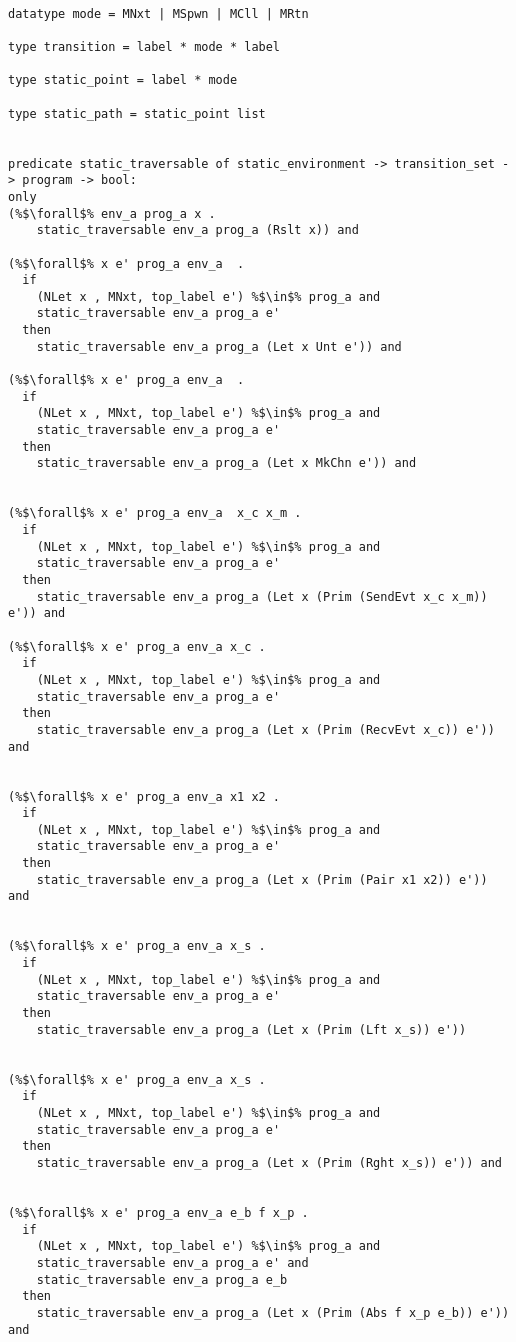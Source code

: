 \documentclass{article}
\begin{document}
\begin{lstlisting}[language=logic, escapechar=\%]

datatype mode = MNxt | MSpwn | MCll | MRtn

type transition = label * mode * label

type static_point = label * mode

type static_path = static_point list


predicate static_traversable of static_environment -> transition_set -> program -> bool:
only
(%$\forall$% env_a prog_a x .
    static_traversable env_a prog_a (Rslt x)) and

(%$\forall$% x e' prog_a env_a  .
  if
    (NLet x , MNxt, top_label e') %$\in$% prog_a and
    static_traversable env_a prog_a e'
  then
    static_traversable env_a prog_a (Let x Unt e')) and

(%$\forall$% x e' prog_a env_a  .
  if
    (NLet x , MNxt, top_label e') %$\in$% prog_a and
    static_traversable env_a prog_a e'
  then
    static_traversable env_a prog_a (Let x MkChn e')) and


(%$\forall$% x e' prog_a env_a  x_c x_m .
  if
    (NLet x , MNxt, top_label e') %$\in$% prog_a and
    static_traversable env_a prog_a e'
  then
    static_traversable env_a prog_a (Let x (Prim (SendEvt x_c x_m)) e')) and

(%$\forall$% x e' prog_a env_a x_c .
  if
    (NLet x , MNxt, top_label e') %$\in$% prog_a and
    static_traversable env_a prog_a e'
  then
    static_traversable env_a prog_a (Let x (Prim (RecvEvt x_c)) e')) and


(%$\forall$% x e' prog_a env_a x1 x2 .
  if
    (NLet x , MNxt, top_label e') %$\in$% prog_a and
    static_traversable env_a prog_a e'
  then
    static_traversable env_a prog_a (Let x (Prim (Pair x1 x2)) e')) and


(%$\forall$% x e' prog_a env_a x_s .
  if
    (NLet x , MNxt, top_label e') %$\in$% prog_a and
    static_traversable env_a prog_a e'
  then
    static_traversable env_a prog_a (Let x (Prim (Lft x_s)) e'))


(%$\forall$% x e' prog_a env_a x_s .
  if
    (NLet x , MNxt, top_label e') %$\in$% prog_a and
    static_traversable env_a prog_a e'
  then
    static_traversable env_a prog_a (Let x (Prim (Rght x_s)) e')) and


(%$\forall$% x e' prog_a env_a e_b f x_p .
  if
    (NLet x , MNxt, top_label e') %$\in$% prog_a and
    static_traversable env_a prog_a e' and
    static_traversable env_a prog_a e_b
  then
    static_traversable env_a prog_a (Let x (Prim (Abs f x_p e_b)) e')) and


\end{lstlisting}
\end{document}
